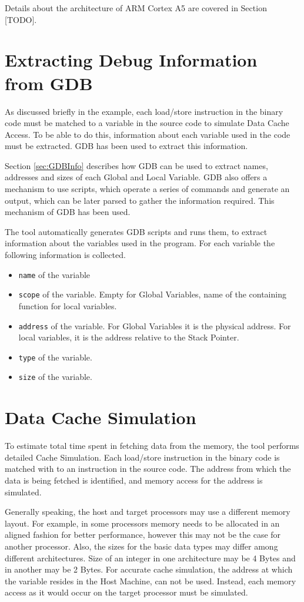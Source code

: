 Details about the architecture of ARM Cortex A5 are covered in Section [TODO].


\section{Extracting Debug Information from GDB}
\label{sec:C3GDBInfo}
As discussed briefly in the example, each load/store instruction in the binary code must be matched to a variable in the source code to simulate Data Cache Access. To be able to do this, information about each variable used in the code must be extracted. GDB has been used to extract this information.

Section \ref{sec:GDBInfo} describes how GDB can be used to extract names, addresses and sizes of each Global and Local Variable. GDB also offers a mechanism to use scripts, which operate a series of commands and generate an output, which can be later parsed to gather the information required. This mechanism of GDB has been used.

The tool automatically generates GDB scripts and runs them, to extract information about the variables used in the program. For each variable the following information is collected.

\begin{itemize} \itemsep -6pt
\item \texttt{name} of the variable
\item \texttt{scope} of the variable. Empty for Global Variables, name of the containing function for local variables.
\item \texttt{address} of the variable. For Global Variables it is the physical address. For local variables, it is the address relative to the Stack Pointer.
\item \texttt{type} of the variable.
\item \texttt{size} of the variable.
\end{itemize}

\section{Data Cache Simulation}
To estimate total time spent in fetching data from the memory, the tool performs detailed Cache Simulation. Each load/store instruction in the binary code is matched with to an instruction in the source code. The address from which the data is being fetched is identified, and memory access for the address is simulated. 

Generally speaking, the host and target processors may use a different memory layout. For example, in some processors memory needs to be allocated in an aligned fashion for better performance, however this may not be the case for another processor. Also, the sizes for the basic data types may differ among different architectures. Size of an integer in one architecture may be 4 Bytes and in another may be 2 Bytes. For accurate cache simulation, the address at which the variable resides in the Host Machine, can not be used. Instead, each memory access as it would occur on the target processor must be simulated.

